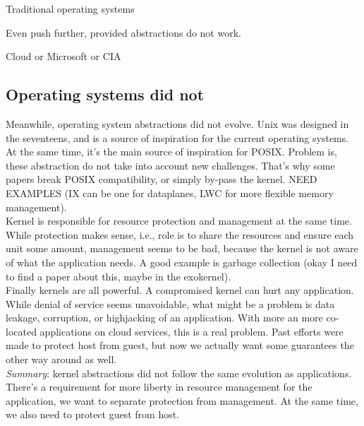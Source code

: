 Traditional operating systems

Even push further, provided abstractions do not work.


Cloud or Microsoft or CIA

\subsection{Operating systems did not}

Meanwhile, operating system abstractions did not evolve.
Unix was designed in the seventeens, and is a source of inspiration for the current operating systems.
At the same time, it's the main source of inspiration for POSIX.
Problem is, these abstraction do not take into account new challenges.
That's why some papers break POSIX compatibility, or simply by-pass the kernel.
NEED EXAMPLES (IX can be one for dataplanes, LWC for more flexible memory management).\\

Kernel is responsible for resource protection and management at the same time.
While protection makes sense, i.e., role is to share the resources and ensure each unit some amount,
management seems to be bad, because the kernel is not aware of what the application needs.
A good example is garbage collection (okay I need to find a paper about this, maybe in the exokernel).\\

Finally kernels are all powerful. A compromised kernel can hurt any application.
While denial of service seems unavoidable, what might be a problem is data leakage, corruption, or highjacking of an application.
With more an more co-located applications on cloud services, this is a real problem.
Past efforts were made to protect host from guest, but now we actually want some guarantees the other way around as well.\\

\textit{Summary}: kernel abstractions did not follow the same evolution as applications.
There's a requirement for more liberty in resource management for the application, we want to separate protection from management.
At the same time, we also need to protect guest from host.

